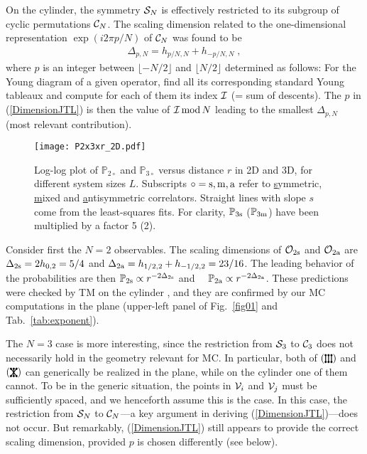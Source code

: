 \documentclass[aps,prl,twocolumn,showpacs,superscriptaddress,groupedaddress]{revtex4}  %
\def\bbp{{\mathbb P}}
\newcommand{\PPPa}{
\left(
\begin{tikzpicture}[baseline=1pt]
 \draw [fill] (0,0) circle(0.2ex);
 \draw [fill] (0.1,0) circle(0.2ex);
 \draw [fill] (0.2,0) circle(0.2ex);
 \draw [fill] (0,0.25) circle(0.2ex);
 \draw [fill] (0.1,0.25) circle(0.2ex);
 \draw [fill] (0.2,0.25) circle(0.2ex);
  \draw [thick] (0,0)--(0,0.25);
  \draw [thick] (0.1,0)--(0.1,0.25);
  \draw [thick] (0.2,0)--(0.2,0.25);
\end{tikzpicture}
\right)}
\newcommand{\PPPf}{
\left(
\begin{tikzpicture}[baseline=1pt]
 \draw [fill] (0,0) circle(0.2ex);
 \draw [fill] (0.1,0) circle(0.2ex);
 \draw [fill] (0.2,0) circle(0.2ex);
 \draw [fill] (0,0.25) circle(0.2ex);
 \draw [fill] (0.1,0.25) circle(0.2ex);
 \draw [fill] (0.2,0.25) circle(0.2ex);
  \draw [thick] (0,0)--(0.2,0.25);
  \draw [thick] (0.1,0)--(0.1,0.25);
  \draw [thick] (0.2,0)--(0.0,0.25);
\end{tikzpicture}
\right)}
\begin{document}
On the cylinder, the symmetry ${\cal S}_N$ is effectively restricted to its subgroup of cyclic permutations ${\cal C}_N$.
The scaling dimension related to the one-dimensional representation $\exp(i2\pi p/N)$ of ${\cal C}_N$ was found to be \cite{CJV}
\begin{eqnarray}
\Delta_{p,N}=h_{p/N,N}+h_{-p/N,N} \;,
\label{DimensionJTL}
\end{eqnarray}
where $p$ is an integer between $\lfloor-N/2\rfloor$ and $\lfloor N/2\rfloor$ determined as follows:
For the Young diagram of a given operator, find all its corresponding standard Young tableaux and compute for each of them its index ${\cal I}$ (= sum of descents).
The $p$ in (\ref{DimensionJTL}) is then the value of ${\cal I} \, \mbox{mod} \, N$ leading to the smallest $\Delta_{p,N}$ (most relevant contribution).


\begin{figure}
\texttt{[image: P2x3xr\_2D.pdf]}
\caption{Log-log plot of $\bbp_{2 \circ}$  and $\bbp_{3 \circ}$ versus distance $r$ in 2D and 3D,
for different system sizes $L$.  Subscripts $\circ={\rm s}, {\rm m}, {\rm a}$ refer to
\underline{s}ymmetric, \underline{m}ixed and \underline{a}ntisymmetric correlators.
Straight lines with slope $s$ come from the least-squares fits.
For clarity,  $\bbp_{\rm 3{\rm s}}$ ($\bbp_{\rm 3{\rm m}}$) have been multiplied by a factor 5 (2).
}
\label{fig01}
\end{figure}

Consider first the $N=2$ observables. The scaling dimensions of $\mathcal{O}_{\rm 2s}$ and $\mathcal{O}_{\rm 2a}$ are
$\Delta_{\rm 2s}=2h_{0,2}=5/4$ and $\Delta_{\rm 2a}=h_{1/2,2}+h_{-1/2,2}=23/16$. The leading behavior of the probabilities are then
$\bbp_{2{\rm s}} \propto r^{-2\Delta_{\rm 2s}}$ and $\quad\bbp_{2{\rm a}} \propto r^{-2\Delta_{\rm 2a}}$. 
These predictions were checked by TM on the cylinder \cite{CJV},
and they are confirmed by our MC computations in the plane (upper-left panel of Fig.~\eqref{fig01} and Tab.~\ref{tab:exponent}).

The $N=3$ case is more interesting, since the restriction from ${\cal S}_3$ to ${\cal C}_3$ does not necessarily hold in the geometry relevant for MC.
In particular, both of $\PPPa$ and $\PPPf$ can generically be realized in the plane, while on the cylinder one of them cannot. 
To be in the generic situation, the points in ${\cal V}_i$ and ${\cal V}_j$ must be sufficiently spaced,
and we henceforth assume this is the case. In this case, the restriction from ${\cal S}_N$ to ${\cal C}_N$---a key argument in
deriving (\ref{DimensionJTL})---does not occur. But remarkably, (\ref{DimensionJTL}) still appears to provide
the correct scaling dimension, provided $p$ is chosen differently (see below).
\end{document}
